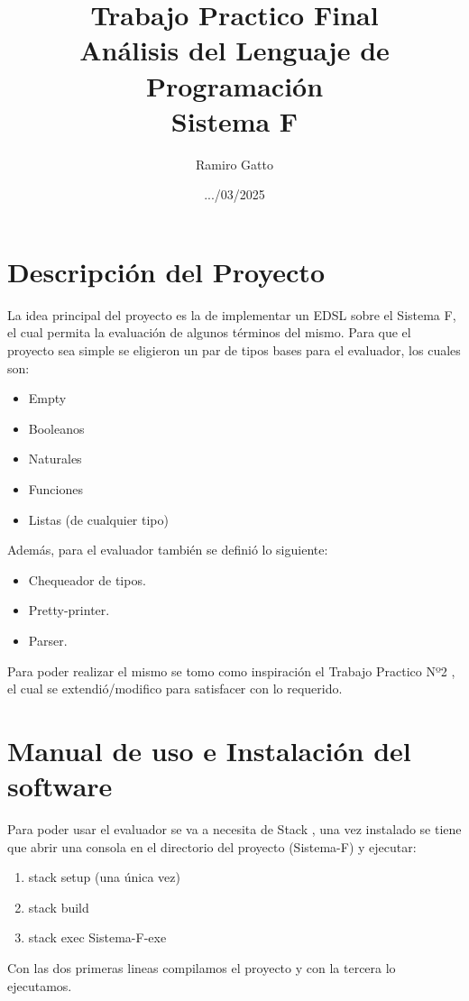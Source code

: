 \documentclass[12pt, titlepage, a4paper]{article}
\title{Trabajo Practico Final \\ 
Análisis del Lenguaje de Programación \\
Sistema F}
\author{Ramiro Gatto}
\date{.../03/2025}
\begin{document}
\maketitle

\section{Descripción del Proyecto}
La idea principal del proyecto es la de implementar un EDSL sobre el Sistema F, el cual permita la evaluación de algunos términos del mismo. Para  
que el proyecto sea simple se eligieron un par de tipos bases para el evaluador, los cuales son: 
\begin{itemize}[label=$\bullet$]
    \item {Empty}
    \item {Booleanos}
    \item {Naturales}
    \item {Funciones}
    \item {Listas (de cualquier tipo)}
\end{itemize}

\noindent Además, para el evaluador también se definió lo siguiente:
\begin{itemize}[label=$\bullet$]
    \item {Chequeador de tipos.}
    \item {Pretty-printer.}
    \item {Parser.}
\end{itemize}

Para poder realizar el mismo se tomo como inspiración el Trabajo Practico Nº2 \cite{tp2:lambdaCalculoSimpleTipado}, el cual se 
extendió/modifico para satisfacer con lo requerido.


\section{Manual de uso e Instalación del software}
Para poder usar el evaluador se va a necesita de Stack \cite{haskellStack}, una vez instalado se tiene que abrir una consola en el 
directorio del proyecto (Sistema-F) y ejecutar:
\begin{enumerate}
    \item stack setup (una única vez)
    \item stack build
    \item stack exec Sistema-F-exe
\end{enumerate}

\noindent Con las dos primeras lineas compilamos el proyecto y con la tercera lo ejecutamos.
\end{document}
